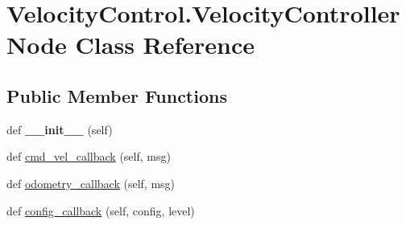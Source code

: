 \hypertarget{classVelocityControl_1_1VelocityControllerNode}{}\section{Velocity\+Control.\+Velocity\+Controller\+Node Class Reference}
\label{classVelocityControl_1_1VelocityControllerNode}
\subsection*{Public Member Functions}
\begin{DoxyCompactItemize}
\item 
\mbox{\label{classVelocityControl_1_1VelocityControllerNode_aa39b6cabe2a67601568114d46a083321}} 
def {\bfseries \+\_\+\+\_\+init\+\_\+\+\_\+} (self)
\item 
def \hyperlink{classVelocityControl_1_1VelocityControllerNode_a14a17c208508b85af5d7149ffea4bf96}{cmd\+\_\+vel\+\_\+callback} (self, msg)
\item 
def \hyperlink{classVelocityControl_1_1VelocityControllerNode_afbacd39bef58879044d31ad2934bd2dc}{odometry\+\_\+callback} (self, msg)
\item 
def \hyperlink{classVelocityControl_1_1VelocityControllerNode_a39d29d51fd97aec62b1f4cb4666c31b1}{config\+\_\+callback} (self, config, level)
\end{DoxyCompactItemize}
